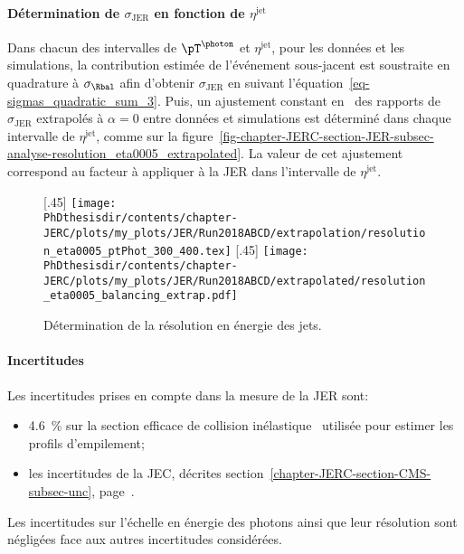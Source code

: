 \paragraph{Détermination de $\sigma_\text{JER}$ en fonction de $\eta^\text{jet}$}
Dans chacun des intervalles de $\pT^{\photon}$ et $\eta^\text{jet}$, pour les données et les simulations, la contribution estimée de l'événement sous-jacent est soustraite en quadrature à $\sigma_{\Rbal}$ afin d'obtenir $\sigma_\text{JER}$ en suivant l'équation~\eqref{eq-sigmas_quadratic_sum_3}.
Puis, un ajustement constant en \pT\ des rapports de $\sigma_\text{JER}$ extrapolés à $\alpha=0$ entre données et simulations est déterminé dans chaque intervalle de $\eta^\text{jet}$, comme sur la figure~\ref{fig-chapter-JERC-section-JER-subsec-analyse-resolution_eta0005_extrapolated}.
La valeur de cet ajustement correspond au facteur à appliquer à la JER dans l'intervalle de $\eta^\text{jet}$.
\begin{figure}[h]
\centering
{}[.45\textwidth]
{\texttt{[image: \\PhDthesisdir/contents/chapter-JERC/plots/my\_plots/JER/Run2018ABCD/extrapolation/resolution\_eta0005\_ptPhot\_300\_400.tex]}}
\hfill
{}[.45\textwidth]
{\texttt{[image: \\PhDthesisdir/contents/chapter-JERC/plots/my\_plots/JER/Run2018ABCD/extrapolated/resolution\_eta0005\_balancing\_extrap.pdf]}}

\caption{Détermination de la résolution en énergie des jets.}
\end{figure}
\paragraph{Incertitudes}
Les incertitudes prises en compte dans la mesure de la JER sont:
\begin{itemize}
\item \SI{4.6}{\%} sur la section efficace de collision inélastique \proton\proton\ utilisée pour estimer les profils d'empilement;
\item les incertitudes de la JEC, décrites section~\ref{chapter-JERC-section-CMS-subsec-unc}, page~\pageref{chapter-JERC-section-CMS-subsec-unc}.
\end{itemize}
Les incertitudes sur l'échelle en énergie des photons ainsi que leur résolution sont négligées face aux autres incertitudes considérées.
